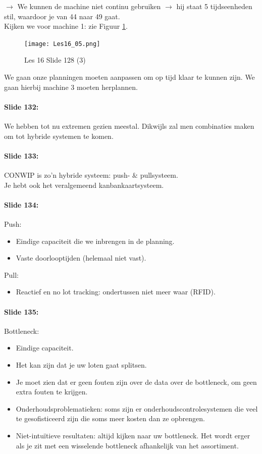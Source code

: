 \documentclass[10pt,a4paper]{report}
\begin{document}
$\rightarrow$ We kunnen de machine niet continu gebruiken $\rightarrow$ hij staat 5 tijdseenheden stil, waardoor je van 44 naar 49 gaat.\\
Kijken we voor machine 1: zie Figuur \ref{les16_05}.\\

\begin{figure}[h!]
\centering
\texttt{[image: Les16\_05.png]}
\caption{Les 16 Slide 128 (3)} 
\label{les16_05}
\end{figure}

We gaan onze planningen moeten aanpassen om op tijd klaar te kunnen zijn. We gaan hierbij machine 3 moeten herplannen.

\paragraph{Slide 132:} We hebben tot nu extremen gezien meestal. Dikwijls zal men combinaties maken om tot hybride systemen te komen.

\paragraph{Slide 133:} CONWIP is zo'n hybride systeem: push- $\&$ pullsysteem.\\
Je hebt ook het veralgemeend kanbankaartsysteem.

\paragraph{Slide 134:} Push:
\begin{itemize}
\item Eindige capaciteit die we inbrengen in de planning.
\item Vaste doorlooptijden (helemaal niet vast). %
\end{itemize}
Pull:
\begin{itemize}
\item Reactief en no lot tracking: ondertussen niet meer waar (RFID).
\end{itemize}

\paragraph{Slide 135:} Bottleneck:
\begin{itemize}
\item Eindige capaciteit.
\item Het kan zijn dat je uw loten gaat splitsen.
\item Je moet zien dat er geen fouten zijn over de data over de bottleneck, om geen extra fouten te krijgen.
\item Onderhoudsproblematieken: soms zijn er onderhoudscontrolesystemen die veel te gesofisticeerd zijn die soms meer kosten dan ze opbrengen. 
\item Niet-intu\"itieve resultaten: altijd kijken naar uw  bottleneck. Het wordt erger als je zit met een wisselende bottleneck afhankelijk van het assortiment. 
\end{itemize}
\end{document}
